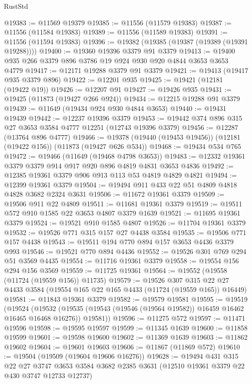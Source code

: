 \begin{lexlean}{RustStd}
\begin{coremodule}
@19383 := @11569 @19379
@19385 := @11556 (@11579 @19383)
@19387 := @11556 (@11584 @19383)
@19389 := @11556 (@11589 @19383)
@19391 := @11556 (@11594 @19383)
@19396 := @19382 (@19385 (@19387 (@19389 (@19391 @19288))))
@19400 := @19360 @19396 @3379 @91 @3379
@19413 := @19400 @935 @266 @3379 @896 @3786 @19 @924 @930 @920 @4844 @3653 @3653 @4779
@19417 := @12171 @19288 @3379 @91 @3379
@19421 := @19413 (@19417 @935 @3379 @896)
@19422 := @12201 @935
@19425 := @19421 (@12181 (@19422 @19))
@19426 := @12207 @91
@19427 := @19426 @935
@19431 := @19425 (@11873 (@19427 @266 @924))
@19434 := @12215 @19288 @91 @3379
@19439 := @11649 (@19434 @924 @930 @4844 @3653)
@19440 := @19431 @19439
@19442 := @12237 @19396 @3379
@19453 := @19442 @374 @896 @315 @27 @3653 @3584 @4777 @12251 (@12743 @19396 @3379)
@19456 := @12287 (@13764 @896 @4777)
@19466 := @19378 (@19440 (@19453 @19456)) (@12181 (@19422 @156)) (@11873 (@19427 @626 @534))
@19468 := @19434 @534 @765
@19472 := @19466 (@11649 (@19468 @4798 @3653))
@19483 := @12332 @19361 @3379 @3379 @914 @917 @920 @896 @4819 @4831 @3653 @4836
@19492 := @12385 @19361 @3379 @906 @913 @113 @53 @4819 @4829 @4821
@19494 := @12399 @19361 @3379
@19504 := @19494 @911 @433 @22 @51 @4809 @4818 @4828 @3682 @2324 @3631
@19506 := @11672 @19361 @3379
@19509 := @19506 @911 @22 @4809
@19511 := @11681 @19361 @3379
@19519 := @19511 @572 @910 @1585 @22 @3653 @4807 @3379 @1639
@19521 := @11695 @19361 @3379
@19524 := @19521 @910 @1585 @4807
@19526 := @11704 @19361 @3379
@19532 := @19526 @771 @315 @157 @27 @4438 @3584
@19535 := @19506 @771 @157 @4438
@19543 := @19511 @194 @770 @894 @157 @3653 @4436 @3379 @993
@19546 := @19521 @770 @894 @4436
@19552 := @19526 @301 @769 @294 @51 @3569 @4435
@19554 := @11716 @19361 @3379
@19558 := @19554 @156 @294 @156 @3569
@19559 := @11725 @19361
@19564 := @19552 (@19558 (@11724 (@19559 @156)) @11735)
@19579 := @19526
    @307
    @315
    @22
    @27
    @4433
    @3584
    (@19554 @165 @22 @165 @4433 (@11724 (@19559 @165)) @16449)
@19581 := @11843 @19361 @3379
@19582 := @19579 @19581
@19595 := @19519
    (@19524
      (@19532 (@19535 (@19543 (@19546 (@19564 @19582)) @16459 @16462 @16465 @16468 @16276)) @19581))
@19596 := @11275 @572
@19597 := @11471 @19596
@19598 := @19595 @19597
@19599 := @11345 @1639
@19600 := @11858 @19599
@19601 := @19598 @19600
@19602 := @11369 @1639
@19603 := @11862 @19602
@19604 := @19601 @19603
@19606 := @11867 (@11869 @572)
@19610 := @19504 (@19509 (@19604 @19606 @16276))
@19628 := @19494
    @431
    @315
    @22
    @27
    @3747
    @3653
    @3584
    @3682
    @2385
    @3631
    (@12510 @19361 @3379 @22 @430 @3747 @12733 @12737)

\end{coremodule}
\end{lexlean}
